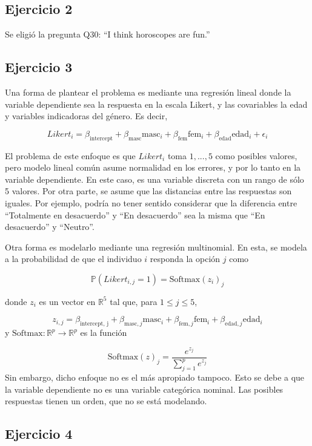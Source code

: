 \documentclass[
]{article}
\begin{document}
\subsection{Ejercicio 2}\label{ejercicio-2}

Se eligió la pregunta Q30: ``I think horoscopes are fun.''

\subsection{Ejercicio 3}\label{ejercicio-3}

Una forma de plantear el problema es mediante una regresión lineal donde
la variable dependiente sea la respuesta en la escala Likert, y las
covariables la edad y variables indicadoras del género. Es decir,

\[
Likert_i = \beta_{\text{intercept}} + \beta_{\text{masc}} \text{masc}_i + \beta_{\text{fem}} \text{fem}_i + \beta_{\text{edad}} \text{edad}_i + \epsilon_i
\]

El problema de este enfoque es que \(Likert_i\) toma \(1,...,5\) como
posibles valores, pero modelo lineal común asume normalidad en los
errores, y por lo tanto en la variable dependiente. En este caso, es una
variable discreta con un rango de sólo 5 valores. Por otra parte, se
asume que las distancias entre las respuestas son iguales. Por ejemplo,
podría no tener sentido considerar que la diferencia entre ``Totalmente
en desacuerdo'' y ``En desacuerdo'' sea la misma que ``En desacuerdo'' y
``Neutro''.

Otra forma es modelarlo mediante una regresión multinomial. En esta, se
modela a la probabilidad de que el individuo \(i\) responda la opción
\(j\) como

\[
\mathbb{P}(Likert_{i, j} = 1) = \text{Softmax}(z_i)_j
\]

donde \(z_i\) es un vector en \(\mathbb{R}^5\) tal que, para
\(1 \leq j \leq 5\),

\[
z_{i, j} = \beta_{\text{intercept, j}} + \beta_{\text{masc}, j} \text{masc}_i + \beta_{\text{fem}, j} \text{fem}_i + \beta_{\text{edad}, j} \text{edad}_i
\] y \(\text{Softmax} : \mathbb{R}^p \to \mathbb{R}^p\) es la función

\[
\text{Softmax}(z)_j = \frac{e^{z_j}}{\sum_{j=1}^{p} e^{z_j}}
\] Sin embargo, dicho enfoque no es el más apropiado tampoco. Esto se
debe a que la variable dependiente no es una variable categórica
nominal. Las posibles respuestas tienen un orden, que no se está
modelando.

\subsection{Ejercicio 4}\label{ejercicio-4}
\end{document}
